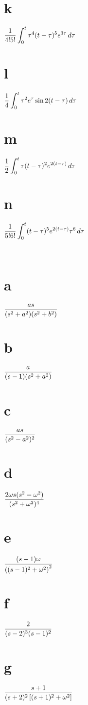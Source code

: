 \quad\;
\part{k} $\displaystyle{\frac{1}{4!5!}\int_{0}^{t}\tau^{4}(t-\tau)^{5}
e^{3\tau}\,d\tau}$
\part{l} $\displaystyle{\frac{1}{4}\int_{0}^{t}\tau^{2}e^{\tau}
\sin2(t-\tau)\,d\tau}$

\quad\;
\part{m}  $\displaystyle{\frac{1}{2}\int_{0}^{t}\tau(t-\tau)^{2}
e^{2(t-\tau)}\,d\tau}$
 \part{n}  $\displaystyle{\frac{1}{5!6!}\int_{0}^{t}
(t-\tau)^{5}e^{2(t-\tau)}\tau^{6}\,d\tau}$

\;  \,\part{a}   $\displaystyle\frac{as}{(s^{2}+a^{2})(s^{2}+b^{2})}$\;
\part{b}  $\displaystyle\frac{a}{(s-1)(s^{2}+a^{2})}$\;
\part{c} $\displaystyle\frac{as}{(s^{2}-a^{2})^{2}}$\;
\part{d}  $\displaystyle\frac{2\omega s(s^{2}-\omega^{2})}{(s^{2}+\omega^{2})^{4}}$

\quad\;  \;
\part{e} $\displaystyle\frac{(s-1)\omega}{\left((s-1)^{2}+
\omega^{2}\right)^{2}}$\;
\part{f} $\displaystyle\frac{2}{(s-2)^{3}(s-1)^{2}}$\;
\part{g} $\displaystyle\frac{s+1}{(s+2)^{2}\left[(s+1)^{2}+
\omega^{2}\right]}$

